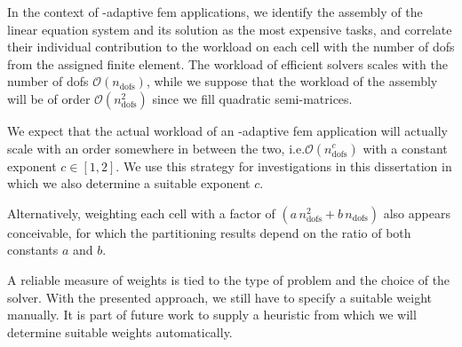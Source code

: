 


In the context of \hp-adaptive \gls{fem} applications, we identify the assembly of the linear equation system and its solution as the most expensive tasks, and correlate their individual contribution to the workload on each cell with the number of \glspl{dof} from the assigned finite element.
The workload of efficient solvers scales with the number of \glspl{dof} $\mathcal{O}\left(n_\text{dofs}\right)$, while we suppose that the workload of the assembly will be of order $\mathcal{O}\left(n_\text{dofs}^2\right)$ since we fill quadratic semi-matrices.

We expect that the actual workload of an \hp-adaptive \gls{fem} application will actually scale with an order somewhere in between the two, i.e.\@ $\mathcal{O}\left(n_\text{dofs}^c\right)$ with a constant exponent $c \in [1,2]$. We use this strategy for investigations in this dissertation in which we also determine a suitable exponent $c$.

Alternatively, weighting each cell with a factor of $(a \, n_\text{dofs}^2 + b \, n_\text{dofs})$ also appears conceivable, for which the partitioning results depend on the ratio of both constants $a$ and $b$.


A reliable measure of weights is tied to the type of problem and the choice of the solver. With the presented approach, we still have to specify a suitable weight manually. It is part of future work to supply a heuristic from which we will determine suitable weights automatically. %